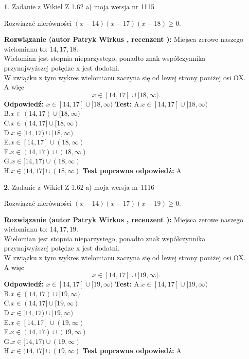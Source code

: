 \documentclass[12pt, a4paper]{article}
\theoremstyle{definition} %
\newtheorem{zad}{}
\newcommand{\zadStart}[1]{\begin{zad}#1\newline}
\newcommand{\zadStop}{\end{zad}}
\newcommand{\rozwStart}[2]{\noindent \textbf{Rozwiązanie (autor #1 , recenzent #2): }\newline}
\newcommand{\rozwStop}{\newline}
\newcommand{\odpStart}{\noindent \textbf{Odpowiedź:}\newline}
\newcommand{\odpStop}{\newline}
\newcommand{\testStart}{\noindent \textbf{Test:}\newline}
\newcommand{\testStop}{\newline}
\newcommand{\kluczStart}{\noindent \textbf{Test poprawna odpowiedź:}\newline}
\newcommand{\kluczStop}{\newline}
\begin{document}
\zadStart{Zadanie z Wikieł Z 1.62 a) moja wersja nr 1115}

Rozwiązać nierówności $(x-14)(x-17)(x-18)\ge0$.
\zadStop
\rozwStart{Patryk Wirkus}{}
Miejsca zerowe naszego wielomianu to: $14, 17, 18$.\\
Wielomian jest stopnia nieparzystego, ponadto znak współczynnika przy\linebreak najwyższej potędze x jest dodatni.\\ W związku z tym wykres wielomianu zaczyna się od lewej strony poniżej osi OX. A więc $$x \in [14,17] \cup [18,\infty).$$
\rozwStop
\odpStart
$x \in [14,17] \cup [18,\infty)$
\odpStop
\testStart
A.$x \in [14,17] \cup [18,\infty)$\\
B.$x \in (14,17) \cup [18,\infty)$\\
C.$x \in (14,17] \cup [18,\infty)$\\
D.$x \in [14,17) \cup [18,\infty)$\\
E.$x \in [14,17] \cup (18,\infty)$\\
F.$x \in (14,17) \cup (18,\infty)$\\
G.$x \in [14,17) \cup (18,\infty)$\\
H.$x \in (14,17] \cup (18,\infty)$
\testStop
\kluczStart
A
\kluczStop



\zadStart{Zadanie z Wikieł Z 1.62 a) moja wersja nr 1116}

Rozwiązać nierówności $(x-14)(x-17)(x-19)\ge0$.
\zadStop
\rozwStart{Patryk Wirkus}{}
Miejsca zerowe naszego wielomianu to: $14, 17, 19$.\\
Wielomian jest stopnia nieparzystego, ponadto znak współczynnika przy\linebreak najwyższej potędze x jest dodatni.\\ W związku z tym wykres wielomianu zaczyna się od lewej strony poniżej osi OX. A więc $$x \in [14,17] \cup [19,\infty).$$
\rozwStop
\odpStart
$x \in [14,17] \cup [19,\infty)$
\odpStop
\testStart
A.$x \in [14,17] \cup [19,\infty)$\\
B.$x \in (14,17) \cup [19,\infty)$\\
C.$x \in (14,17] \cup [19,\infty)$\\
D.$x \in [14,17) \cup [19,\infty)$\\
E.$x \in [14,17] \cup (19,\infty)$\\
F.$x \in (14,17) \cup (19,\infty)$\\
G.$x \in [14,17) \cup (19,\infty)$\\
H.$x \in (14,17] \cup (19,\infty)$
\testStop
\kluczStart
A
\kluczStop
\end{document}
